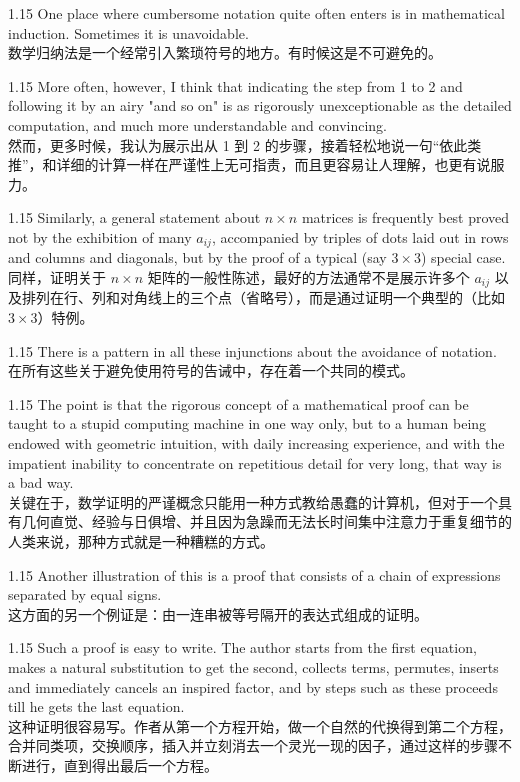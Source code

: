 \documentclass[12pt,a4paper]{article}
\newcommand{\bilingual}[2]{
    \begin{spacing}{1.15} %
        \noindent \normalsize #1 \\[-0.5ex] %
        \small \textcolor{blue!70!black}{#2} %
    \end{spacing}
    \vspace{0.8em} %
}
\begin{document}
\bilingual{One place where cumbersome notation quite often enters is in mathematical induction. Sometimes it is unavoidable.}
{数学归纳法是一个经常引入繁琐符号的地方。有时候这是不可避免的。} %

\bilingual{More often, however, I think that indicating the step from 1 to 2 and following it by an airy "and so on" is as rigorously unexceptionable as the detailed computation, and much more understandable and convincing.}
{然而，更多时候，我认为展示出从 1 到 2 的步骤，接着轻松地说一句“依此类推”，和详细的计算一样在严谨性上无可指责，而且更容易让人理解，也更有说服力。} %

\bilingual{Similarly, a general statement about $n\times n$ matrices is frequently best proved not by the exhibition of many $a_{ij}$, accompanied by triples of dots laid out in rows and columns and diagonals, but by the proof of a typical (say $3\times3$) special case.}
{同样，证明关于 $n\times n$ 矩阵的一般性陈述，最好的方法通常不是展示许多个 $a_{ij}$ 以及排列在行、列和对角线上的三个点（省略号），而是通过证明一个典型的（比如 $3\times3$）特例。} %

\bilingual{There is a pattern in all these injunctions about the avoidance of notation.}
{在所有这些关于避免使用符号的告诫中，存在着一个共同的模式。} %

\bilingual{The point is that the rigorous concept of a mathematical proof can be taught to a stupid computing machine in one way only, but to a human being endowed with geometric intuition, with daily increasing experience, and with the impatient inability to concentrate on repetitious detail for very long, that way is a bad way.}
{关键在于，数学证明的严谨概念只能用一种方式教给愚蠢的计算机，但对于一个具有几何直觉、经验与日俱增、并且因为急躁而无法长时间集中注意力于重复细节的人类来说，那种方式就是一种糟糕的方式。} %

\bilingual{Another illustration of this is a proof that consists of a chain of expressions separated by equal signs.}
{这方面的另一个例证是：由一连串被等号隔开的表达式组成的证明。} %

\bilingual{Such a proof is easy to write. The author starts from the first equation, makes a natural substitution to get the second, collects terms, permutes, inserts and immediately cancels an inspired factor, and by steps such as these proceeds till he gets the last equation.}
{这种证明很容易写。作者从第一个方程开始，做一个自然的代换得到第二个方程，合并同类项，交换顺序，插入并立刻消去一个灵光一现的因子，通过这样的步骤不断进行，直到得出最后一个方程。} %
\end{document}

